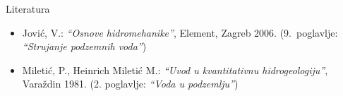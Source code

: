 \documentclass[croatian]{beamer}
\begin{document}
%
\begin{frame}{Literatura}
\begin{itemize}
\item Jović, V.: \emph{``Osnove hidromehanike''}, Element, Zagreb 2006.
(9.~poglavlje: \emph{``Strujanje podzemnih voda''}) 
\item Miletić, P., Heinrich Miletić M.: \emph{``Uvod u kvantitativnu hidrogeologiju''},
Varaždin 1981. (2. poglavlje: \emph{``Voda u podzemlju''})\vfill{}
 \vfill{}
 \vfill{}
 \vfill{}
 \vfill{}
 
\end{itemize}
\end{frame}
\end{document}
